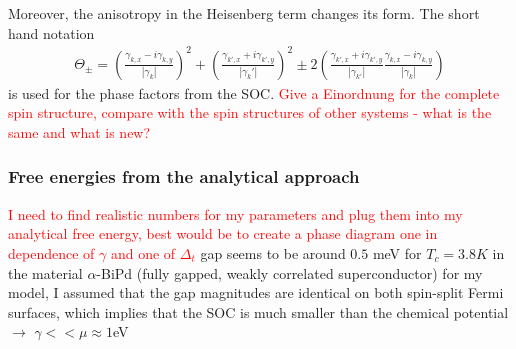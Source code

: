Moreover, the anisotropy in the Heisenberg term changes its form. \newline
The short hand notation
\begin{align} \nonumber
    \Theta_{\pm} = \left(\frac{\gamma_{k,x} - i \gamma_{k,y}}{|\gamma_k|}\right)^2+ \left( \frac{\gamma_{k',x} + i \gamma_{k',y}}{|\gamma_k'|}\right)^2 \pm 2 \left( \frac{\gamma_{k',x}+i\gamma_{k',y}}{|\gamma_{k'}|}\frac{\gamma_{k,x}-i\gamma_{k,y}}{|\gamma_{k}|} \right)
\end{align}
is used for the phase factors from the SOC.\newline
\textcolor{red}{Give a Einordnung for the complete spin structure, compare with the spin structures of other systems - what is the same and what is new?}\newline

\subsubsection{Free energies from the analytical approach}
\textcolor{red}{I need to find realistic numbers for my parameters and plug them into my analytical free energy, best would be to create a phase diagram one in dependence of $\gamma$ and one of $\Delta_t$}\newline
gap seems to be around $0.5$ meV for $T_c = 3.8K$ in the material $\alpha$-BiPd (fully gapped, weakly correlated superconductor) \cite{smidman2017superconductivity} \newline
for my model, I assumed that the gap magnitudes are identical on both spin-split Fermi surfaces, which implies that the SOC is much smaller than the chemical potential $\rightarrow$ $\gamma << \mu \approx 1$eV